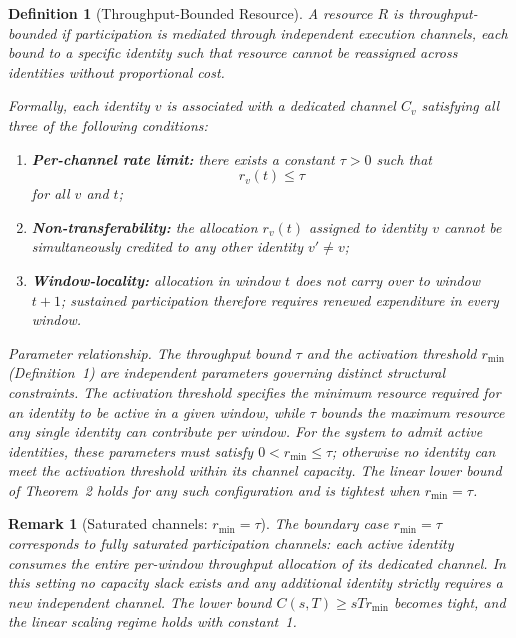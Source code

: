 \documentclass[journal]{IEEEtran}
\newtheorem{definition}{Definition}
\newtheorem{remark}{Remark}
\begin{document}
	\begin{definition}[Throughput-Bounded Resource]
		\label{def:throughput}
		A resource $R$ is \emph{throughput-bounded} if participation
		is mediated through independent execution channels, each
		bound to a specific identity such that resource cannot be
		reassigned across identities without proportional cost.
		
		Formally, each identity $v$ is associated with a dedicated
		channel $C_v$ satisfying all three of the following conditions:
		\begin{enumerate}
			\item \textbf{Per-channel rate limit:} there exists a
			constant $\tau > 0$ such that
			\[
			r_v(t) \le \tau
			\]
			for all $v$ and $t$;
			\item \textbf{Non-transferability:} the allocation
			$r_v(t)$ assigned to identity $v$ cannot be
			simultaneously credited to any other identity
			$v' \neq v$;
			\item \textbf{Window-locality:} allocation in window
			$t$ does not carry over to window $t+1$; sustained
			participation therefore requires renewed expenditure
			in every window.
		\end{enumerate}
		
		\noindent\textit{Parameter relationship.}
		The throughput bound $\tau$ and the activation threshold
		$r_{\min}$ (Definition~1) are independent parameters
		governing distinct structural constraints.
		The activation threshold specifies the minimum resource
		required for an identity to be active in a given window,
		while $\tau$ bounds the maximum resource any single identity
		can contribute per window.
		For the system to admit active identities, these parameters
		must satisfy $0 < r_{\min} \le \tau$; otherwise no identity
		can meet the activation threshold within its channel capacity.
		The linear lower bound of Theorem~2 holds for any such
		configuration and is tightest when $r_{\min} = \tau$.
	\end{definition}
	
	\begin{remark}[Saturated channels: $r_{\min}=\tau$]
		The boundary case $r_{\min}=\tau$ corresponds to fully
		saturated participation channels: each active identity
		consumes the entire per-window throughput allocation
		of its dedicated channel.
		In this setting no capacity slack exists and any
		additional identity strictly requires a new independent
		channel.
		The lower bound $C(s,T)\ge s T r_{\min}$ becomes tight,
		and the linear scaling regime holds with constant~1.
	\end{remark}
	
\end{document}
